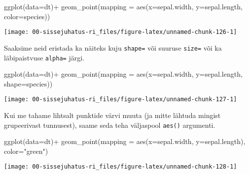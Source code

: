 \documentclass[
]{book}
\newenvironment{Shaded}{\begin{snugshade}}{\end{snugshade}}
\newcommand{\AttributeTok}[1]{\textcolor[rgb]{0.77,0.63,0.00}{#1}}
\newcommand{\FunctionTok}[1]{\textcolor[rgb]{0.00,0.00,0.00}{#1}}
\newcommand{\NormalTok}[1]{#1}
\newcommand{\SpecialCharTok}[1]{\textcolor[rgb]{0.00,0.00,0.00}{#1}}
\newcommand{\StringTok}[1]{\textcolor[rgb]{0.31,0.60,0.02}{#1}}
\begin{document}
\begin{Shaded}
\begin{Highlighting}[]
\FunctionTok{ggplot}\NormalTok{(}\AttributeTok{data=}\NormalTok{dt)}\SpecialCharTok{+}
  \FunctionTok{geom\_point}\NormalTok{(}\AttributeTok{mapping =} \FunctionTok{aes}\NormalTok{(}\AttributeTok{x=}\NormalTok{sepal.width, }\AttributeTok{y=}\NormalTok{sepal.length, }\AttributeTok{color=}\NormalTok{species))}
\end{Highlighting}
\end{Shaded}

\begin{center}\texttt{[image: 00-sissejuhatus-ri\_files/figure-latex/unnamed-chunk-126-1]} \end{center}

Saaksime neid eristada ka näiteks kuju \texttt{shape=} või suuruse \texttt{size=} või ka läbipaistvuse \texttt{alpha=} järgi.

\begin{Shaded}
\begin{Highlighting}[]
\FunctionTok{ggplot}\NormalTok{(}\AttributeTok{data=}\NormalTok{dt)}\SpecialCharTok{+}
  \FunctionTok{geom\_point}\NormalTok{(}\AttributeTok{mapping =} \FunctionTok{aes}\NormalTok{(}\AttributeTok{x=}\NormalTok{sepal.width, }\AttributeTok{y=}\NormalTok{sepal.length, }\AttributeTok{shape=}\NormalTok{species))}
\end{Highlighting}
\end{Shaded}

\begin{center}\texttt{[image: 00-sissejuhatus-ri\_files/figure-latex/unnamed-chunk-127-1]} \end{center}

Kui me tahame lihtsalt punktide värvi muuta (ja mitte lähtuda mingist grupeerivast tunnusest), saame seda teha väljaspool \texttt{aes()} argumenti.

\begin{Shaded}
\begin{Highlighting}[]
\FunctionTok{ggplot}\NormalTok{(}\AttributeTok{data=}\NormalTok{dt)}\SpecialCharTok{+}
  \FunctionTok{geom\_point}\NormalTok{(}\AttributeTok{mapping =} \FunctionTok{aes}\NormalTok{(}\AttributeTok{x=}\NormalTok{sepal.width, }\AttributeTok{y=}\NormalTok{sepal.length), }\AttributeTok{color=}\StringTok{"green"}\NormalTok{)}
\end{Highlighting}
\end{Shaded}

\begin{center}\texttt{[image: 00-sissejuhatus-ri\_files/figure-latex/unnamed-chunk-128-1]} \end{center}
\end{document}
